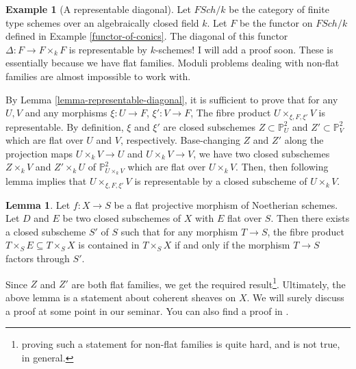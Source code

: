 \documentclass[11pt]{amsart}
\renewcommand{\P}{{\mathbb P}}
\theoremstyle{definition}
\newtheorem{lemma}[theorem]{Lemma}
\newtheorem{example}[theorem]{Example}
\begin{document}
\begin{example}[A representable diagonal] 
	Let $\mathit{FSch/k}$ be the category of finite type schemes over an algebraically closed field $k$. Let $F$ be the functor on $\mathit{FSch/k}$ defined in Example \ref{functor-of-conics}. The diagonal of this functor $\Delta: F\rightarrow F\times_k F$ is representable by $k$-schemes! I will add a proof soon. These is essentially because we have flat families. Moduli problems dealing with non-flat families are almost impossible to work with.
	
	By Lemma \ref{lemma-representable-diagonal}, it is sufficient to prove that for any $U,V$ and any morphisms $\xi:U\rightarrow F$, $\xi':V\rightarrow F$, The fibre product $U\times_{\xi,F,\xi'} V$ is representable. By definition, $\xi$ and $\xi'$ are closed subschemes $Z\subset \P_U^2$ and $Z'\subset \P_V^2$ which are flat over $U$ and $V$, respectively. Base-changing $Z$ and $Z'$ along the projection maps $U\times_k V\rightarrow U$ and $U\times_k V\rightarrow V$, we have two closed subschemes $Z\times_k V$ and $Z'\times_k U$ of $\P_{U\times_k V}^2$ which are flat over $U\times_k V$. Then, then following lemma implies that $U\times_{\xi,F,\xi'} V$ is representable by a closed subscheme of $U\times_k V$.
	
	
	
\begin{lemma}
	\label{lemma-equalising-flat-subschemes}
	Let $f: X\rightarrow S$ be a flat projective morphism of Noetherian schemes. Let $D$ and $E$ be two closed subschemes of $X$ with $E$ flat over $S$. Then there exists a closed subscheme $S'$ of $S$ such that for any morphism $T\rightarrow S$, the fibre product $T\times_S E\subseteq T\times_S X$ is contained in $T\times_S X$ if and only if the morphism $T\rightarrow S$ factors through $S'$.
\end{lemma}

Since $Z$ and $Z'$ are both flat families, we get the required result\footnote{proving such a statement for non-flat families is quite hard, and is not true, in general.}. Ultimately, the above lemma is a statement about coherent sheaves on $X$. We will surely discuss a proof at some point in our seminar. You can also find a proof in \cite[Lemma B.6.2]{ACV03}.

\end{example}
\end{document}
